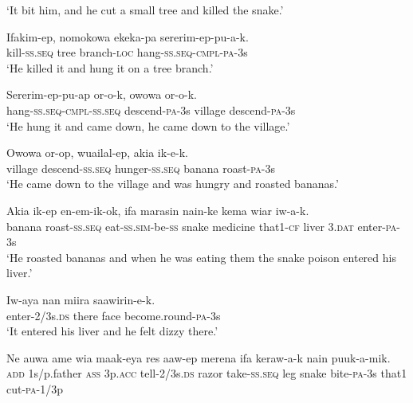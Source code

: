 \glt ‘It bit him, and he cut a small tree and killed the snake.’ \\
\z


\ea
\gll  Ifakim-ep,  nomokowa  ekeka-pa  sererim-ep-pu-a-k. \\
kill-\textsc{ss.seq}  tree  branch-\textsc{loc}  hang-\textsc{ss.seq}-\textsc{cmpl}-\textsc{pa}-3s \\
\glt ‘He killed it and hung it on a tree branch.’ \\
\z


\ea
\gll  Sererim-ep-pu-ap  or-o-k,  owowa  or-o-k. \\
hang-\textsc{ss.seq}-\textsc{cmpl}-\textsc{ss.seq}  descend-\textsc{pa}-3s  village  descend-\textsc{pa}-3s \\
\glt ‘He hung it and came down, he came down to the village.’ \\
\z


\ea
\gll  Owowa  or-op,  wuailal-ep,  akia  ik-e-k. \\
village  descend-\textsc{ss.seq}  hunger-\textsc{ss.seq}  banana  roast-\textsc{pa}-3s \\
\glt ‘He came down to the village and was hungry and roasted bananas.’ \\
\z


\ea
\gll  Akia  ik-ep  en-em-ik-ok,  ifa  marasin  nain-ke              kema  wiar  iw-a-k. \\
banana  roast-\textsc{ss.seq}  eat-\textsc{ss}.\textsc{sim}-be-\textsc{ss}  snake  medicine  that1-\textsc{cf}   liver  3.\textsc{dat}  enter-\textsc{pa}-3s \\


\glt ‘He roasted bananas and when he was eating them the snake poison entered his liver.’ \\
\z


\ea
\gll  Iw-aya  nan  miira  saawirin-e-k. \\
enter-2/3s.\textsc{ds}  there  face  become.round-\textsc{pa}-3s \\
\glt ‘It entered his liver and he felt dizzy there.’ \\
\z


\ea
\gll  Ne  auwa  ame  wia  maak-eya  res  aaw-ep                  merena  ifa  keraw-a-k  nain  puuk-a-mik. \\
\textsc{add}  1s/p.father  \textsc{ass}  3p.\textsc{acc}  tell-2/3s.\textsc{ds}  razor  take-\textsc{ss.seq}  leg  snake  bite-\textsc{pa}-3s  that1  cut-\textsc{pa}-1/3p \\


